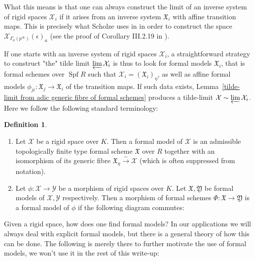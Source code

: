 \documentclass[11pt,oneside]{amsart}
\theoremstyle{definition}
\newtheorem{definition}[theorem]{Definition}
\theoremstyle{remark}
\begin{document}
	What this means is that one can always construct the limit of an inverse system of rigid spaces $\mathcal X_i$ if it arises from an inverse system $\mathfrak X_i$ with affine transition maps. This is precisely what Scholze uses in \cite{torsion} in order to construct the space $\mathcal X_{\Gamma_0(p^\infty)}(\epsilon)_a$ (see the proof of Corollary III.2.19 in \cite{torsion}).
	
	If one starts with an inverse system of rigid spaces $\mathcal X_i$, a straightforward strategy to construct "the" tilde limit $\varprojlim \mathcal X_i$ is thus to look for formal models $\mathfrak X_i$, that is formal schemes over $\operatorname{Spf} R$ such that $\mathcal X_i = (\mathfrak X_i)_\eta$, as well as affine formal models $\phi_{ji}:\mathfrak X_j\rightarrow \mathfrak X_i$ of the transition maps. If such data exists, Lemma~\ref{tilde-limit from adic generic fibre of formal schemes} produces a tilde-limit $\mathcal X \sim \varprojlim \mathcal X_i$. Here we follow the following standard terminology:
	\begin{definition}
		\begin{enumerate}
			\item Let $\mathcal X$ be a rigid space over $K$. Then a formal model of $\mathcal X$ is an admissible topologically finite type formal scheme $\mathfrak X$ over $R$ together with an isomorphism of its generic fibre $\mathfrak X_\eta \xrightarrow{\sim} \mathcal X$ (which is often suppressed from notation).
			\item Let $\phi:\mathcal X\rightarrow \mathcal Y$ be a morphism of rigid spaces over $K$. Let $\mathfrak X,\mathfrak Y$ be formal models of $\mathcal X,\mathcal Y$ respectively. Then a morphism of formal schemes $\Phi:\mathfrak X \rightarrow \mathfrak Y$ is a formal model of $\phi$ if the following diagram commutes:
			\begin{center}
			\end{center}
			
		\end{enumerate}
		
	\end{definition}	
	Given a rigid space, how does one find formal models? In our applications we will always deal with explicit formal models, but there is a general theory of how this can be done. The following is merely there to further motivate the use of formal models, we won't use it in the rest of this write-up:
	
\end{document}
